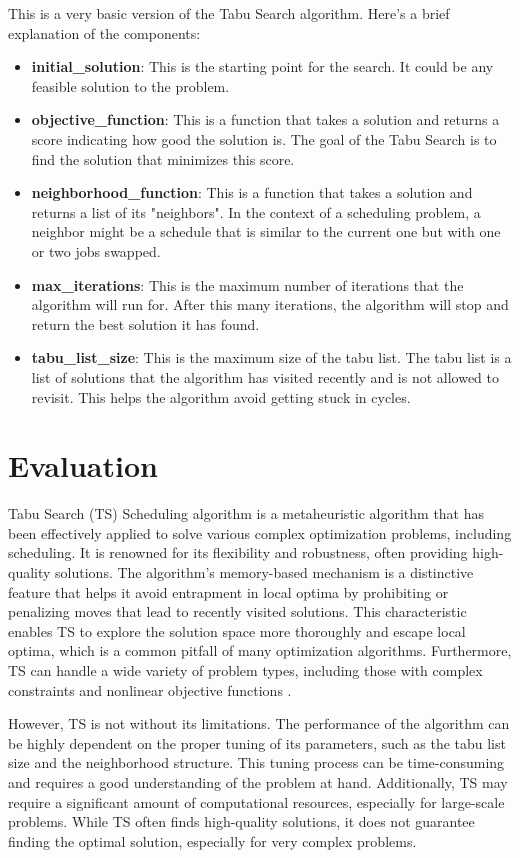 \documentclass[conference]{IEEEtran}
\begin{document}
This is a very basic version of the Tabu Search algorithm. Here's a brief explanation of the components:

\begin{itemize}
    \item \textbf{initial\_solution}: This is the starting point for the search. It could be any feasible solution to the problem.
    \item \textbf{objective\_function}: This is a function that takes a solution and returns a score indicating how good the solution is. The goal of the Tabu Search is to find the solution that minimizes this score.
    \item \textbf{neighborhood\_function}: This is a function that takes a solution and returns a list of its "neighbors". In the context of a scheduling problem, a neighbor might be a schedule that is similar to the current one but with one or two jobs swapped.
    \item \textbf{max\_iterations}: This is the maximum number of iterations that the algorithm will run for. After this many iterations, the algorithm will stop and return the best solution it has found.
    \item \textbf{tabu\_list\_size}: This is the maximum size of the tabu list. The tabu list is a list of solutions that the algorithm has visited recently and is not allowed to revisit. This helps the algorithm avoid getting stuck in cycles.
\end{itemize}


\section{Evaluation}
Tabu Search (TS) Scheduling algorithm is a metaheuristic algorithm that has been effectively applied to solve various complex optimization problems, including scheduling. It is renowned for its flexibility and robustness, often providing high-quality solutions. The algorithm's memory-based mechanism is a distinctive feature that helps it avoid entrapment in local optima by prohibiting or penalizing moves that lead to recently visited solutions. This characteristic enables TS to explore the solution space more thoroughly and escape local optima, which is a common pitfall of many optimization algorithms. Furthermore, TS can handle a wide variety of problem types, including those with complex constraints and nonlinear objective functions \cite{ieeexplore2020} \cite{glover1997tabu}.

However, TS is not without its limitations. The performance of the algorithm can be highly dependent on the proper tuning of its parameters, such as the tabu list size and the neighborhood structure. This tuning process can be time-consuming and requires a good understanding of the problem at hand. Additionally, TS may require a significant amount of computational resources, especially for large-scale problems. While TS often finds high-quality solutions, it does not guarantee finding the optimal solution, especially for very complex problems.
\end{document}
